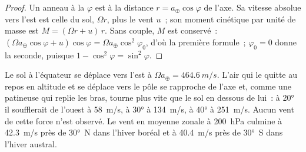 \begin{proof}
Un anneau à la  $\varphi$ est à la distance $r = a_\oplus\cos\varphi$ de
l'axe. Sa vitesse absolue vers l'est est celle du sol, $\Omega r$, plus le vent
$u$~; son moment cinétique par unité de masse est $M = (\Omega r + u)\,r$. Sans couple,
$M$ est conservé~: $(\Omega a_\oplus\cos\varphi + u)\cos\varphi = \Omega a_\oplus
\cos^2\varphi_0$, d'où la première formule~; $\varphi_0 = 0$ donne la seconde, puisque
$1 - \cos^2\varphi = \sin^2\varphi$.
\end{proof}

Le sol à l'équateur se déplace vers l'est à $\Omega a_\oplus = \qty{464.6}{m/s}$. L'air qui
le quitte au repos en altitude et se déplace vers le pôle se rapproche de l'axe et, comme une
patineuse qui replie les bras, tourne plus vite que le sol en dessous de lui~: à
\ang{20} il soufflerait de l'ouest à \qty{58}{m/s}, à \ang{30} à
\qty{134}{m/s}, à \ang{40} à \qty{251}{m/s}. Aucun vent de cette force n'est observé.
Le vent en moyenne zonale à \qty{200}{hPa} culmine à \qty{42.3}{m/s} près de \ang{30}~N dans
l'hiver boréal et à \qty{40.4}{m/s} près de \ang{30}~S dans l'hiver austral.

